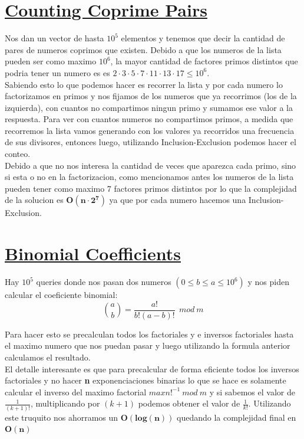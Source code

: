 \documentclass{article}
\begin{document}
\section{\href{https://cses.fi/problemset/task/2417}{Counting Coprime Pairs}}
Nos dan un vector de hasta $10^5$ elementos y tenemos que decir la cantidad de pares de numeros coprimos que existen.
Debido a que los numeros de la lista pueden ser como maximo $10^6$, la mayor cantidad de factores primos distintos que podria tener un numero es es $2 \cdot 3 \cdot 5 \cdot 7 \cdot 11 \cdot 13 \cdot 17 \le 10^6$.
\\ \indent Sabiendo esto lo que podemos hacer es recorrer la lista y por cada numero lo factorizamos en primos y nos fijamos de los numeros que ya recorrimos (los de la izquierda), con cuantos no compartimos ningun primo y sumamos ese valor a la respuesta.
Para ver con cuantos numeros no compartimos primos, a medida que recorremos la lista vamos generando con los valores ya recorridos una frecuencia de sus divisores, entonces luego, utilizando Inclusion-Exclusion podemos hacer el conteo.
\\ \indent Debido a que no nos interesa la cantidad de veces que aparezca cada primo, sino si esta o no en la factorizacion, como mencionamos antes los numeros de la lista pueden tener como maximo 7 factores primos distintos por lo que la complejidad de la solucion es $\bm{O(n \cdot 2^7)}$ ya que por cada numero hacemos una Inclusion-Exclusion.

\section{\href{https://cses.fi/problemset/task/1079}{Binomial Coefficients}}
Hay $10^5$ queries donde nos pasan dos numeros $(0 \leq b \leq a \leq 10^6)$ y nos piden calcular el coeficiente binomial:
\[
\binom{a}{b} = \frac{a!}{b!(a - b)! } \:\: mod \: m
\]

Para hacer esto se precalculan todos los factoriales y e inversos factoriales hasta el maximo numero que nos puedan pasar y luego utilizando la formula anterior calculamos el resultado.
\\ \indent El detalle interesante es que para precalcular de forma eficiente todos los inversos factoriales y no hacer \textbf{n} exponenciaciones binarias lo que se hace es solamente calcular el inverso del maximo factorial $maxn!^{-1} \: mod \: m$ y si sabemos el valor de $\frac{1}{(k + 1)!}$, multiplicando por $(k + 1)$ podemos obtener el valor de $\frac{1}{k!}$. Utilizando este truquito nos ahorramos un $\bm{O(log(n))}$ quedando la complejidad final en $\bm{O(n)}$
    
\end{document}
